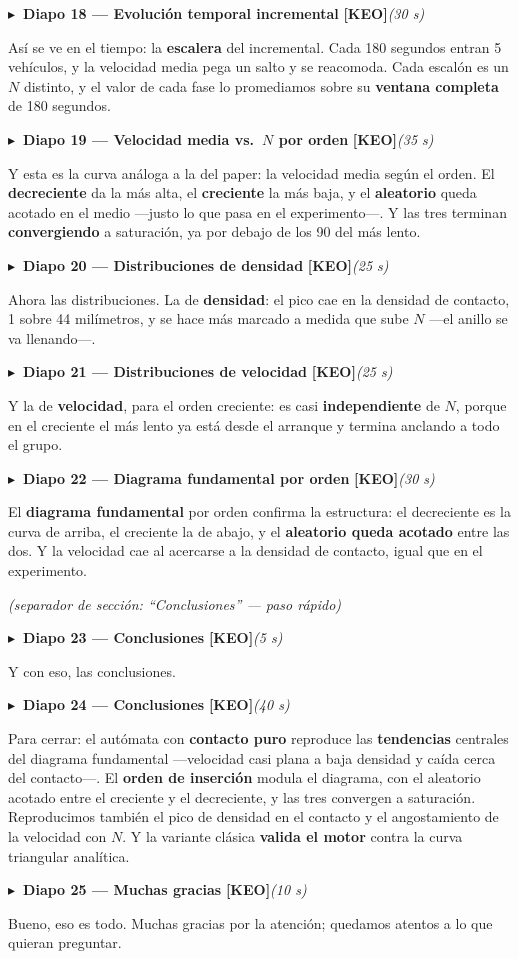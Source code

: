 \documentclass[11pt,a4paper]{article}
\newcommand{\diapo}[5]{%
  \medskip\par\noindent
  \textcolor{#4}{\textbf{$\blacktriangleright$\ Diapo #1 --- #2}}\quad
  \textcolor{#4}{\textbf{[#3]}}\hfill{\itshape\small(#5)}\par\nobreak\smallskip
}
\newcommand{\seccion}[1]{\smallskip\par\noindent\textit{(separador de sección: ``#1'' --- paso rápido)}\par}
\begin{document}
\diapo{18}{Evolución temporal incremental}{KEO}{ckeo}{30 s}
Así se ve en el tiempo: la \textbf{escalera} del incremental. Cada 180 segundos entran 5 vehículos, y la
velocidad media pega un salto y se reacomoda. Cada escalón es un $N$ distinto, y el valor de cada fase lo
promediamos sobre su \textbf{ventana completa} de 180 segundos.

\diapo{19}{Velocidad media vs.\ $N$ por orden}{KEO}{ckeo}{35 s}
Y esta es la curva análoga a la del paper: la velocidad media según el orden. El \textbf{decreciente} da la
más alta, el \textbf{creciente} la más baja, y el \textbf{aleatorio} queda acotado en el medio ---justo lo
que pasa en el experimento---. Y las tres terminan \textbf{convergiendo} a saturación, ya por debajo de los
90 del más lento.

\diapo{20}{Distribuciones de densidad}{KEO}{ckeo}{25 s}
Ahora las distribuciones. La de \textbf{densidad}: el pico cae en la densidad de contacto, 1 sobre 44
milímetros, y se hace más marcado a medida que sube $N$ ---el anillo se va llenando---.

\diapo{21}{Distribuciones de velocidad}{KEO}{ckeo}{25 s}
Y la de \textbf{velocidad}, para el orden creciente: es casi \textbf{independiente} de $N$, porque en el
creciente el más lento ya está desde el arranque y termina anclando a todo el grupo.

\diapo{22}{Diagrama fundamental por orden}{KEO}{ckeo}{30 s}
El \textbf{diagrama fundamental} por orden confirma la estructura: el decreciente es la curva de arriba, el
creciente la de abajo, y el \textbf{aleatorio queda acotado} entre las dos. Y la velocidad cae al acercarse
a la densidad de contacto, igual que en el experimento.

\seccion{Conclusiones}
\diapo{23}{Conclusiones}{KEO}{ckeo}{5 s}
Y con eso, las conclusiones.

\diapo{24}{Conclusiones}{KEO}{ckeo}{40 s}
Para cerrar: el autómata con \textbf{contacto puro} reproduce las \textbf{tendencias} centrales del diagrama
fundamental ---velocidad casi plana a baja densidad y caída cerca del contacto---. El \textbf{orden de
inserción} modula el diagrama, con el aleatorio acotado entre el creciente y el decreciente, y las tres
convergen a saturación. Reproducimos también el pico de densidad en el contacto y el angostamiento de la
velocidad con $N$. Y la variante clásica \textbf{valida el motor} contra la curva triangular analítica.

\diapo{25}{Muchas gracias}{KEO}{ckeo}{10 s}
Bueno, eso es todo. Muchas gracias por la atención; quedamos atentos a lo que quieran preguntar.
\end{document}
